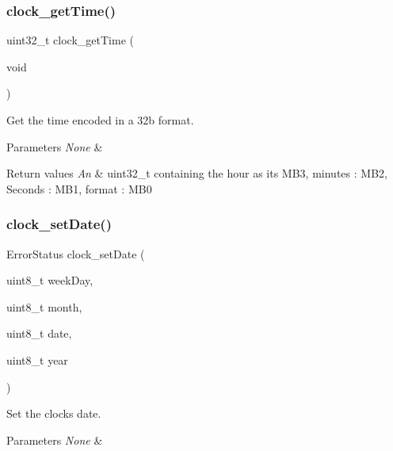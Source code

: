 \subsubsection{\texorpdfstring{clock\+\_\+get\+Time()}{clock\_getTime()}}
{\footnotesize\ttfamily uint32\+\_\+t clock\+\_\+get\+Time (\begin{DoxyParamCaption}\item[{void}]{ }\end{DoxyParamCaption})}



Get the time encoded in a 32b format. 


\begin{DoxyParams}{Parameters}
{\em None} & \\
\hline
\end{DoxyParams}

\begin{DoxyRetVals}{Return values}
{\em An} & uint32\+\_\+t containing the hour as its M\+B3, minutes \+: M\+B2, Seconds \+: M\+B1, format \+: M\+B0 \\
\hline
\end{DoxyRetVals}
\mbox{\label{group___time___date_gaf16498fa2702bfda6b89a3335ccc7ca6}} 
\subsubsection{\texorpdfstring{clock\+\_\+set\+Date()}{clock\_setDate()}}
{\footnotesize\ttfamily Error\+Status clock\+\_\+set\+Date (\begin{DoxyParamCaption}\item[{uint8\+\_\+t}]{week\+Day,  }\item[{uint8\+\_\+t}]{month,  }\item[{uint8\+\_\+t}]{date,  }\item[{uint8\+\_\+t}]{year }\end{DoxyParamCaption})}



Set the clock\textquotesingle{}s date. 


\begin{DoxyParams}{Parameters}
{\em None} & \\
\hline
\end{DoxyParams}

